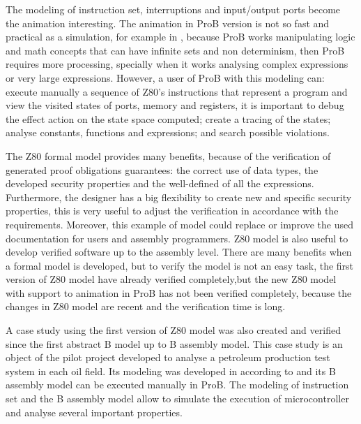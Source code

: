 \documentclass[a4paper]{llncs}
\begin{document}
The modeling of instruction set, interruptions and input/output ports become the animation interesting.
The animation in ProB version is not so fast and practical as a simulation, for example in \cite{Simulator_z80},
because ProB works manipulating logic and math concepts that can have infinite sets and non determinism, then ProB requires more processing, specially when it works analysing  complex expressions or very large expressions.
However, a user of ProB with this modeling can: execute manually a sequence of Z80's instructions that represent a program and view the visited states of ports, memory and registers, it is important to debug the effect action on the state space computed; create a tracing of the states; analyse constants, functions and expressions; and search possible violations.





The Z80 formal model provides many benefits, because of the verification of
generated proof obligations guarantees: the correct use of data types, the developed
security properties  and the well-defined of all the expressions. %
Furthermore, the designer has a big flexibility to create new and specific security properties, this is very useful
to adjust the verification in accordance with the requirements. Moreover, this
example of model could replace or improve the used documentation for users and
assembly programmers. Z80 model is also useful to develop verified software 
up to the assembly level. There are many benefits when a formal model is
developed, but to verify the model is not an easy task, the first version of Z80 model have already verified completely,but the new Z80 model with support to animation in ProB has not been verified completely,
because the changes in Z80 model are recent and the verification time is long.

A case study using the first version of Z80 model was also created and verified
since the first abstract B model up to B assembly model. This case study is an
object of the pilot project developed to analyse a petroleum production test
system in each oil field. Its modeling was developed in according to \cite{LAUT_SERGIO}
and its B assembly model can be executed manually in ProB. The modeling of
instruction set and the B assembly model allow to simulate the execution of microcontroller
and analyse several important properties.
\end{document}
